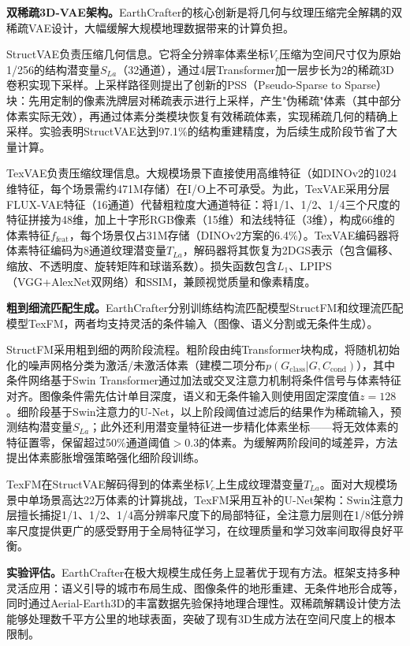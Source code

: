 \textbf{双稀疏3D-VAE架构。}EarthCrafter的核心创新是将几何与纹理压缩完全解耦的双稀疏VAE设计，大幅缓解大规模地理数据带来的计算负担。

StructVAE负责压缩几何信息。它将全分辨率体素坐标$V_c$压缩为空间尺寸仅为原始1/256的结构潜变量$S_{La}$（32通道），通过4层Transformer加一层步长为2的稀疏3D卷积实现下采样。上采样路径则提出了创新的PSS（Pseudo-Sparse to Sparse）块：先用定制的像素洗牌层对稀疏表示进行上采样，产生"伪稀疏"体素（其中部分体素实际无效），再通过体素分类模块恢复有效稀疏体素，实现稀疏几何的精确上采样。实验表明StructVAE达到97.1\%的结构重建精度，为后续生成阶段节省了大量计算。

TexVAE负责压缩纹理信息。大规模场景下直接使用高维特征（如DINOv2的1024维特征，每个场景需约471M存储）在I/O上不可承受。为此，TexVAE采用分层FLUX-VAE特征（16通道）代替粗粒度大通道特征：将1/1、1/2、1/4三个尺度的特征拼接为48维，加上十字形RGB像素（15维）和法线特征（3维），构成66维的体素特征$f_{\text{feat}}$，每个场景仅占31M存储（DINOv2方案的6.4\%）。TexVAE编码器将体素特征编码为8通道纹理潜变量$T_{La}$，解码器将其恢复为2DGS表示（包含偏移、缩放、不透明度、旋转矩阵和球谐系数）。损失函数包含$L_1$、LPIPS（VGG+AlexNet双网络）和SSIM，兼顾视觉质量和像素精度。

\textbf{粗到细流匹配生成。}EarthCrafter分别训练结构流匹配模型StructFM和纹理流匹配模型TexFM，两者均支持灵活的条件输入（图像、语义分割或无条件生成）。

StructFM采用粗到细的两阶段流程。粗阶段由纯Transformer块构成，将随机初始化的噪声网格分类为激活/未激活体素（建模二项分布$p(G_{\text{class}}|G, C_{\text{cond}})$），其中条件网络基于Swin Transformer通过加法或交叉注意力机制将条件信号与体素特征对齐。图像条件需先估计单目深度，语义和无条件输入则使用固定深度值$z=128$。细阶段基于Swin注意力的U-Net，以上阶段阈值过滤后的结果作为稀疏输入，预测结构潜变量$S_{La}$；此外还利用潜变量特征进一步精化体素坐标——将无效体素的特征置零，保留超过50\%通道阈值$>0.3$的体素。为缓解两阶段间的域差异，方法提出体素膨胀增强策略强化细阶段训练。

TexFM在StructVAE解码得到的体素坐标$V_c$上生成纹理潜变量$T_{La}$。面对大规模场景中单场景高达22万体素的计算挑战，TexFM采用互补的U-Net架构：Swin注意力层擅长捕捉1/1、1/2、1/4高分辨率尺度下的局部特征，全注意力层则在1/8低分辨率尺度提供更广的感受野用于全局特征学习，在纹理质量和学习效率间取得良好平衡。

\textbf{实验评估。}EarthCrafter在极大规模生成任务上显著优于现有方法。框架支持多种灵活应用：语义引导的城市布局生成、图像条件的地形重建、无条件地形合成等，同时通过Aerial-Earth3D的丰富数据先验保持地理合理性。双稀疏解耦设计使方法能够处理数千平方公里的地球表面，突破了现有3D生成方法在空间尺度上的根本限制。


